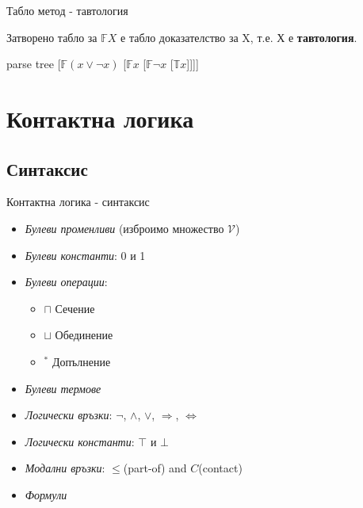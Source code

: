 \documentclass[14pt, aspectratio=169]{beamer}
\newcommand\ST{\mathbb{T}}
\newcommand\SF{\mathbb{F}}
\newcommand\V{\mathcal{V}}
\begin{document}
\begin{frame}{Табло метод - тавтология}
	\begin{lemma}
		Затворено табло за $\SF X$ е табло доказателство за X, т.е. Х е \textbf{тавтология}.
	\end{lemma}
	\small
	\begin{example}
		\begin{center}
		\begin{forest}
			parse tree
			[$\SF (x \lor \neg x)$ [$\SF x$ [$\SF \neg x$ [$\ST x$]]]]
		\end{forest}
		\end{center}
	\end{example}
\end{frame}



\section{Контактна логика}
\subsection{Синтаксис}

\begin{frame}{Контактна логика - синтаксис}
	\begin{itemize}
		\item \textit{Булеви променливи} (изброимо множество $\V$)
		\item \textit{Булеви константи}: 0 и 1
		\item \textit{Булеви операции}:
		\begin{itemize}
			\item $\sqcap$ Сечение
			\item $\sqcup$ Обединение
			\item $^*$ Допълнение
		\end{itemize}
		\item \textit{Булеви термове}
		\item \textit{Логически връзки}: $\neg$, $\land$, $\lor$, $\Rightarrow$, $\Leftrightarrow$
		\item \textit{Логически константи}: $\top$ и $\bot$
		\item \textit{Модални връзки}: $\leq$(part-of) and $C$(contact)
		\item \textit{Формули}
	\end{itemize}
\end{frame}
\end{document}
